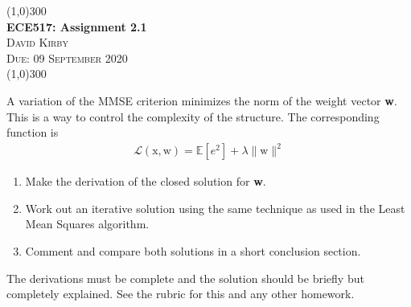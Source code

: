 \documentclass[11pt]{article}
\begin{document}
    \begin{center}
    \line(1,0){300}\\[0.25cm]
 	\Large{\bfseries ECE517: Assignment 2.1}\\
 	\textsc{\large David Kirby}\\
 	\textsc{\large Due: 09 September 2020}\\
 	\line(1,0){300}\\[0.75cm]
     \end{center}

\noindent A variation of the MMSE criterion minimizes the norm of the weight vector \textbf{w}. This is a way to control the complexity of the structure. The corresponding function is
\begin{align}
    \mathcal{L}\left(\bm{\mathrm {x,w}}\right)=\mathbb{E}\left[e^2 \right]+\lambda \parallel \bm{\mathrm {w}}\parallel ^2
\end{align}
\begin{enumerate}
    \item Make the derivation of the closed solution for \textbf{w}.
    \item Work out an iterative solution using the same technique as used in the Least Mean Squares algorithm.
    \item Comment and compare both solutions in a short conclusion section.
\end{enumerate}
The derivations must be complete and the solution should be briefly but completely explained. See the rubric for this and any other homework.\par
\end{document}
